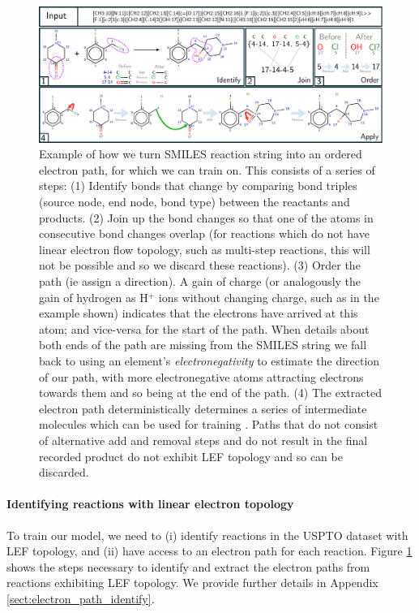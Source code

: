 \begin{figure}[h]
\centering
\includegraphics[width=1.\textwidth]{imgs/dataset_steps}
\caption{
Example of how we turn SMILES reaction string into an ordered electron path, for which we can train \ourModel on. 
This consists of a series of steps: 
(1) Identify bonds that change by comparing bond triples (source node, end node, bond type) between the reactants and products. 
(2) Join up the bond changes so that one of the atoms in consecutive bond changes overlap (for reactions which do not have linear electron flow topology, such as multi-step reactions, this will not be possible and so we discard these reactions).
(3) Order the path (ie assign a direction). A gain of charge (or analogously the gain of hydrogen as H$^+$ ions without changing charge, such as in the example shown) indicates that the electrons have arrived at this atom; and vice-versa for the start of the path.
When details about both ends of the path are missing from the SMILES string we fall back to using an element's {\em electronegativity} to estimate the direction of our path, with more electronegative atoms attracting electrons towards them and so being at the end of the path. 
(4) The extracted electron path deterministically determines a series of intermediate molecules which can be used for training \ourModel. 
Paths that do not consist of alternative add and removal steps and do not result in the final recorded product do not exhibit LEF topology and so can be discarded.
}
\label{fig:dataset_steps}
\end{figure}

\paragraph{Identifying reactions with linear electron topology}
To train our model, we need to (i) identify reactions in the USPTO dataset with LEF topology, and (ii) have access to an electron path for each reaction. 
Figure \ref{fig:dataset_steps} shows the steps necessary to identify and extract the electron paths from reactions exhibiting LEF topology. We provide further details in Appendix \ref{sect:electron_path_identify}.





